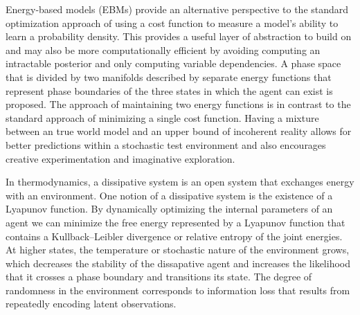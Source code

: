 \documentclass{article}
\begin{document}
Energy-based models (EBMs) provide an alternative perspective to the standard optimization approach of using a cost function to measure a model's ability to learn a probability density. This provides a useful layer of abstraction to build on and may also be more computationally efficient by avoiding computing an intractable posterior and only computing variable dependencies. A phase space that is divided by two manifolds described by separate energy functions that represent phase boundaries of the three states in which the agent can exist is proposed. The approach of maintaining two energy functions is in contrast to the standard approach of minimizing a single cost function. Having a mixture between an true world model and an upper bound of incoherent reality allows for better predictions within a stochastic test environment and also encourages creative experimentation and imaginative exploration. 

In thermodynamics, a dissipative system is an open system that exchanges energy with an environment. One notion of a dissipative system is the existence of a Lyapunov function. By dynamically optimizing the internal parameters of an agent we can minimize the free energy represented by a Lyapunov function that contains a Kullback–Leibler divergence or relative entropy of the joint energies. At higher states, the temperature or stochastic nature of the environment grows, which decreases the stability of the dissapative agent and increases the likelihood that it crosses a phase boundary and transitions its state. The degree of randomness in the environment corresponds to information loss that results from repeatedly encoding latent observations. 
\end{document}
